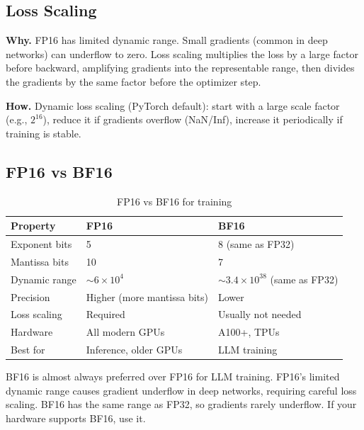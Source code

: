 \subsection{Loss Scaling}

\textbf{Why.} FP16 has limited dynamic range. Small gradients (common in deep networks) can underflow to zero. Loss scaling multiplies the loss by a large factor before backward, amplifying gradients into the representable range, then divides the gradients by the same factor before the optimizer step.

\textbf{How.} Dynamic loss scaling (PyTorch default): start with a large scale factor (e.g., $2^{16}$), reduce it if gradients overflow (NaN/Inf), increase it periodically if training is stable.

\subsection{FP16 vs BF16}

\begin{table}[H]
\centering
\caption{FP16 vs BF16 for training}
\begin{tabularx}{\textwidth}{lXX}
\toprule
\textbf{Property} & \textbf{FP16} & \textbf{BF16} \\
\midrule
Exponent bits & 5 & 8 (same as FP32) \\
Mantissa bits & 10 & 7 \\
Dynamic range & $\sim 6 \times 10^{4}$ & $\sim 3.4 \times 10^{38}$ (same as FP32) \\
Precision & Higher (more mantissa bits) & Lower \\
Loss scaling & Required & Usually not needed \\
Hardware & All modern GPUs & A100+, TPUs \\
Best for & Inference, older GPUs & LLM training \\
\bottomrule
\end{tabularx}
\end{table}

\begin{warningbox}
BF16 is almost always preferred over FP16 for LLM training. FP16's limited dynamic range causes gradient underflow in deep networks, requiring careful loss scaling. BF16 has the same range as FP32, so gradients rarely underflow. If your hardware supports BF16, use it.
\end{warningbox}

